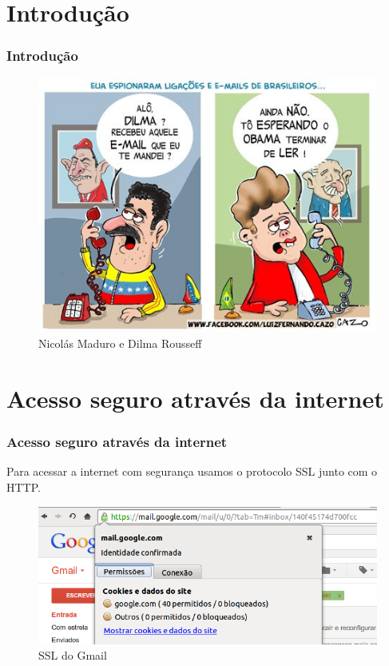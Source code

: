 \section{Introdução}

\begin{frame}\frametitle{Introdução}

\begin{figure}
    \includegraphics[scale=0.5]{img/Espionagem-por-Cazo.jpg}
    \caption{Nicolás Maduro e Dilma Rousseff}
\end{figure}

\end{frame}

\begin{frame}\frametitle{}

 

\end{frame}

\section{Acesso seguro através da internet}

\begin{frame}\frametitle{Acesso seguro através da internet}

Para acessar a internet com segurança usamos o protocolo SSL junto com o
HTTP.

\begin{figure}
    \includegraphics[scale=0.4]{img/gmail-ssl.png}
    \caption{SSL do Gmail}
\end{figure}

\end{frame}

